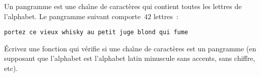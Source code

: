   Un pangramme  est une  cha\^\i{}ne de caract\`eres  qui contient  toutes les  lettres  de
  l'alphabet. Le pangramme suivant comporte~$42$ lettres~: 
\begin{verbatim}
portez ce vieux whisky au petit juge blond qui fume
\end{verbatim}
  \par
  \'Ecrivez une fonction qui v\'erifie si une cha\^\i{}ne de caract\`eres est un pangramme
  (en supposant que l'alphabet est l'alphabet latin minuscule sans
  accents, sans chiffre, etc). 
